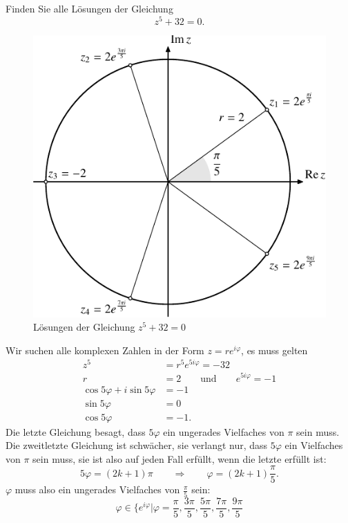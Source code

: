 Finden Sie alle Lösungen der Gleichung
\[
z^5+32=0.
\]

\begin{loesung}
\begin{figure}
\centering
\includegraphics{chapters/uebungsaufgaben/exercise-1.pdf}
\caption{Lösungen der Gleichung $z^5+32=0$
\label{skript:15006:loesungen}}
\end{figure}
Wir suchen alle komplexen Zahlen in der Form $z=re^{i\varphi}$, es muss gelten
\begin{align*}
z^5&=r^5e^{5i\varphi}=-32
\\
r&=2\qquad\text{und}\qquad e^{5i\varphi}=-1
\\
\cos 5\varphi+i\sin 5\varphi&=-1
\\
\sin 5\varphi&=0
\\
\cos 5\varphi&=-1.
\end{align*}
Die letzte Gleichung besagt, dass $5\varphi$ ein ungerades Vielfaches von
$\pi$ sein muss. Die zweitletzte Gleichung ist schwächer, sie verlangt
nur, dass $5\varphi$ ein Vielfaches von $\pi$ sein muss, sie ist also
auf jeden Fall erfüllt, wenn die letzte erfüllt ist:
\[
5\varphi=(2k+1)\pi
\qquad\Rightarrow\qquad
\varphi=(2k+1)\frac{\pi}5.
\]
$\varphi$ muss also ein ungerades Vielfaches von $\frac{\pi}5$ sein:
\[
\varphi\in\biggl\{
e^{i\varphi}\bigg|
\varphi
=
\frac{\pi}{5},
\frac{3\pi}{5},
\frac{5\pi}{5},
\frac{7\pi}{5},
\frac{9\pi}{5}
\]
\end{loesung}
